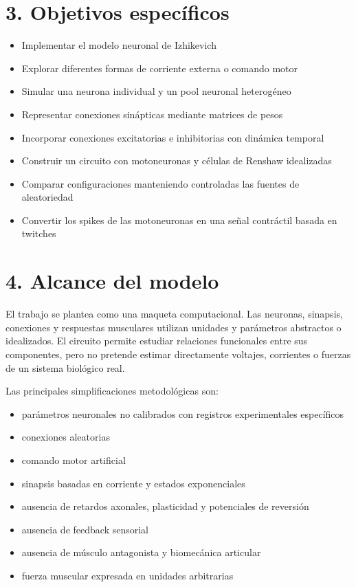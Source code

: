 \documentclass[11pt,a4paper]{article}
\providecommand{\tightlist}{%
  \setlength{\itemsep}{0pt}\setlength{\parskip}{0pt}}
\begin{document}
\hypertarget{objetivos-especuxedficos}{%
\section{3. Objetivos específicos}\label{objetivos-especuxedficos}}

\begin{itemize}
\item
  Implementar el modelo neuronal de Izhikevich
\item
  Explorar diferentes formas de corriente externa o comando motor
\item
  Simular una neurona individual y un pool neuronal heterogéneo
\item
  Representar conexiones sinápticas mediante matrices de pesos
\item
  Incorporar conexiones excitatorias e inhibitorias con dinámica
  temporal
\item
  Construir un circuito con motoneuronas y células de Renshaw
  idealizadas
\item
  Comparar configuraciones manteniendo controladas las fuentes de
  aleatoriedad
\item
  Convertir los spikes de las motoneuronas en una señal contráctil
  basada en twitches
\end{itemize}

\hypertarget{alcance-del-modelo}{%
\section{4. Alcance del modelo}\label{alcance-del-modelo}}

El trabajo se plantea como una maqueta computacional. Las neuronas,
sinapsis, conexiones y respuestas musculares utilizan unidades y
parámetros abstractos o idealizados. El circuito permite estudiar
relaciones funcionales entre sus componentes, pero no pretende estimar
directamente voltajes, corrientes o fuerzas de un sistema biológico
real.

Las principales simplificaciones metodológicas son:

\begin{itemize}
\tightlist
\item
  parámetros neuronales no calibrados con registros experimentales
  específicos
\item
  conexiones aleatorias
\item
  comando motor artificial
\item
  sinapsis basadas en corriente y estados exponenciales
\item
  ausencia de retardos axonales, plasticidad y potenciales de reversión
\item
  ausencia de feedback sensorial
\item
  ausencia de músculo antagonista y biomecánica articular
\item
  fuerza muscular expresada en unidades arbitrarias
\end{itemize}
\end{document}
